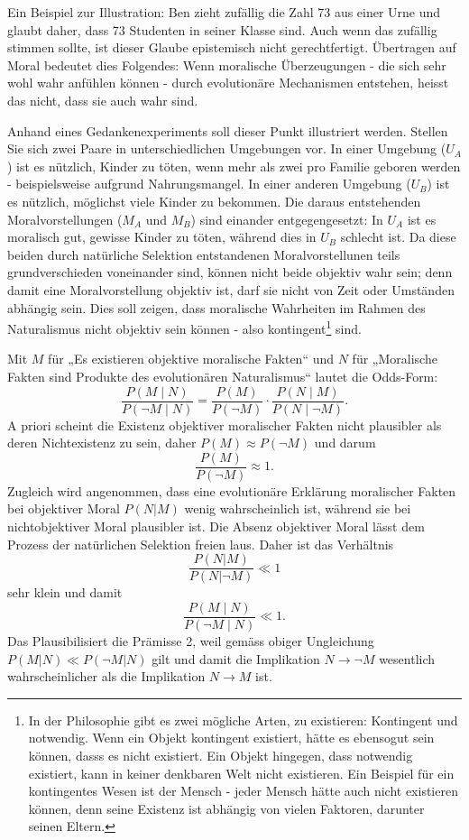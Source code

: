\documentclass[11pt,a4paper]{article}
\begin{document}
	Ein Beispiel zur Illustration: Ben zieht zufällig die Zahl 73 aus einer Urne und glaubt daher, dass 73 Studenten in seiner Klasse sind. Auch wenn das zufällig stimmen sollte, ist dieser Glaube epistemisch nicht gerechtfertigt. Übertragen auf Moral bedeutet dies Folgendes: Wenn moralische Überzeugungen - die sich sehr wohl wahr anfühlen können - durch evolutionäre Mechanismen entstehen, heisst das nicht, dass sie auch wahr sind.
	
	Anhand eines Gedankenexperiments soll dieser Punkt illustriert werden. Stellen Sie sich zwei Paare in unterschiedlichen Umgebungen vor. In einer Umgebung (\(U_A\)) ist es nützlich, Kinder zu töten, wenn mehr als zwei pro Familie geboren werden - beispielsweise aufgrund Nahrungsmangel. In einer anderen Umgebung (\(U_B\)) ist es nützlich, möglichst viele Kinder zu bekommen. Die daraus entstehenden Moralvorstellungen (\(M_A\) und \(M_B\)) sind einander entgegengesetzt: In \(U_A\) ist es moralisch gut, gewisse Kinder zu töten, während dies in \(U_B\) schlecht ist. Da diese beiden durch natürliche Selektion entstandenen Moralvorstellunen teils grundverschieden voneinander sind, können nicht beide objektiv wahr sein; denn damit eine Moralvorstellung objektiv ist, darf sie nicht von Zeit oder Umständen abhängig sein. Dies soll zeigen, dass moralische Wahrheiten im Rahmen des Naturalismus nicht objektiv sein können - also kontingent\footnote{In der Philosophie gibt es zwei mögliche Arten, zu existieren: Kontingent und notwendig. Wenn ein Objekt kontingent existiert, hätte es ebensogut sein können, dasss es nicht existiert. Ein Objekt hingegen, dass notwendig existiert, kann in keiner denkbaren Welt nicht existieren. Ein Beispiel für ein kontingentes Wesen ist der Mensch - jeder Mensch hätte auch nicht existieren können, denn seine Existenz ist abhängig von vielen Faktoren, darunter seinen Eltern.} sind.
	
	\begin{tcolorbox}[title=Mathematik-Box: Prämisse 2]
		Mit \(M\) für „Es existieren objektive moralische Fakten“ und \(N\) für „Moralische Fakten sind Produkte des evolutionären Naturalismus“ lautet die Odds-Form:
		\[
		\frac{P(M\mid N)}{P(\neg M\mid N)}
		=
		\frac{P(M)}{P(\neg M)}
		\cdot
		\frac{P(N\mid M)}{P(N\mid\neg M)}.
		\]
		A priori scheint die Existenz objektiver moralischer Fakten nicht plausibler als deren Nichtexistenz zu sein, daher $P(M) \approx P(\neg M)$ und darum
		\[
		\frac{P(M)}{P(\neg M)}\approx 1.
		\]
		Zugleich wird angenommen, dass eine evolutionäre Erklärung moralischer Fakten bei objektiver Moral $P(N|M)$ wenig wahrscheinlich ist, während sie bei nichtobjektiver Moral plausibler ist. Die Absenz objektiver Moral lässt dem Prozess der natürlichen Selektion freien laus. Daher ist das Verhältnis
		$$
		\frac{P(N|M)}{P(N|\neg M)} \ll 1
		$$
		sehr klein und damit
		\[
		\frac{P(M\mid N)}{P(\neg M\mid N)}\ll 1.
		\]
		Das Plausibilisiert die Prämisse 2, weil gemäss obiger Ungleichung $P(M|N) \ll P(\neg M |N)$ gilt und damit die Implikation $N \rightarrow \neg M$ wesentlich wahrscheinlicher als die Implikation $N\rightarrow M$ ist.
	\end{tcolorbox}
	
\end{document}
